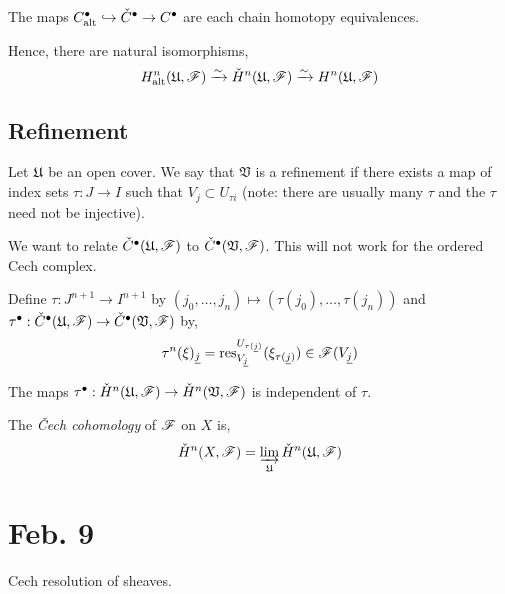 \documentclass[12pt]{article}
\begin{document}
\begin{thm}
The maps $C^\bullet_{\text{alt}} \hookrightarrow \check{C}^\bullet \to C^\bullet$ are each chain homotopy equivalences.
\end{thm}

\begin{cor}
Hence, there are natural isomorphisms,
\[ H^n_{\text{alt}}(\mathfrak{U}, \mathscr{F}) \xrightarrow{\sim} \check{H}^n(\mathfrak{U}, \mathscr{F}) \xrightarrow{\sim} H^n(\mathfrak{U}, \mathscr{F}) \]
\end{cor}

\subsection{Refinement}

\begin{defn}
Let $\mathfrak{U}$ be an open cover. We say that $\mathfrak{V}$ is a refinement if there exists a map of index sets $\tau : J \to I$ such that $V_j \subset U_{\tau{i}}$ (note: there are usually many $\tau$ and the $\tau$ need not be injective). 
\end{defn}

\begin{rmk}
We want to relate $\check{C}^\bullet(\mathfrak{U}, \mathscr{F})$ to $\check{C}^\bullet(\mathfrak{V}, \mathscr{F})$. This will not work for the ordered Cech complex.
\end{rmk}

\begin{defn}
Define $\tau : J^{n+1} \to I^{n+1}$ by $(j_0, \dots, j_n) \mapsto (\tau(j_0), \dots, \tau(j_n))$ and $\tau^\bullet : \check{C}^\bullet(\mathfrak{U}, \mathscr{F}) \to \check{C}^\bullet(\mathfrak{V}, \mathscr{F})$ by,
\[ \tau^n(\xi)_{\underline{j}} = \mathrm{res}^{U_{\tau(\underline{j})}}_{V_{\underline{j}}}(\xi_{\tau(\underline{j})}) \in \mathscr{F}(V_{\underline{j}}) \]
\end{defn}

\begin{thm}
The maps $\tau^\bullet : \check{H}^n(\mathfrak{U}, \mathscr{F}) \to \check{H}^n(\mathfrak{V}, \mathscr{F})$ is independent of $\tau$.
\end{thm}

\begin{defn}
The \textit{\v{C}ech cohomology} of $\mathscr{F}$ on $X$ is,
\[ \check{H}^n(X, \mathscr{F}) = \varinjlim_{\mathfrak{U}} \check{H}^n(\mathfrak{U}, \mathscr{F}) \]
\end{defn}

\section{Feb. 9}

Cech resolution of sheaves.
\end{document}
